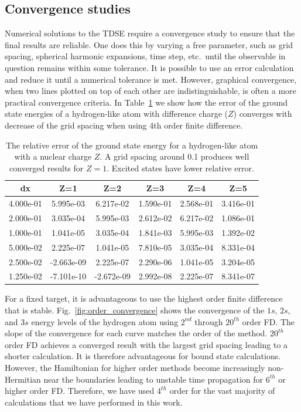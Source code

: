 \subsection{Convergence studies} %
\label{sub:convergence_studies}
Numerical solutions to the TDSE require a convergence study to ensure that the final results are reliable. One does this by varying  a free parameter, such as grid spacing, spherical harmonic expansions, time step, etc.\ until the observable in question remains within some tolerance. It is possible to use an error calculation and reduce it until a numerical tolerance is met. However, graphical convergence, when two lines plotted on top of each other are indistinguishable, is often a more practical convergence criteria. In Table~\ref{tab:grid_spacing} we show how the error of the ground state energies of a hydrogen-like atom with difference charge ($Z$) converges with decrease of the grid spacing when using 4th order finite difference.
\begin{table}[t]
\begin{center}
\begin{tabular}{|c|c|c|c|c|c|}
\hline
dx & Z=1 & Z=2 & Z=3 & Z=4 & Z=5 \\ \hline
4.000e-01 & 5.995e-03 & 6.217e-02 & 1.590e-01 & 2.568e-01 & 3.416e-01\\ \hline
2.000e-01 & 3.035e-04 & 5.995e-03 & 2.612e-02 & 6.217e-02 & 1.086e-01\\ \hline
1.000e-01 & 1.041e-05 & 3.035e-04 & 1.841e-03 & 5.995e-03 & 1.392e-02\\ \hline
5.000e-02 & 2.225e-07 & 1.041e-05 & 7.810e-05 & 3.035e-04 & 8.331e-04\\ \hline
2.500e-02 & -2.663e-09 & 2.225e-07 & 2.290e-06 & 1.041e-05 & 3.204e-05\\ \hline
1.250e-02 & -7.101e-10 & -2.672e-09 & 2.992e-08 & 2.225e-07 & 8.341e-07\\ \hline
\end{tabular}
\end{center}
  \caption{\label{tab:grid_spacing}The relative error of the ground state energy for a hydrogen-like atom with a nuclear charge $Z$. A grid spacing around 0.1 produces well converged results for $Z=1$. Excited states have lower relative error.}
\end{table}

For a fixed target, it is advantageous to use the highest order finite difference that is stable. Fig.~\ref{fig:order_convergence} shows the convergence of the $1s$, $2s$, and $3s$ energy levels of the hydrogen atom using $2^{nd}$ through $20^{th}$ order FD. The slope of the convergence for each curve matches the order of the method. $20^{th}$ order FD achieves a converged result with the largest grid spacing leading to a shorter calculation. It is therefore advantageous for bound state calculations. However, the Hamiltonian for higher order methods become increasingly non-Hermitian near the boundaries leading to unstable time propagation for $6^{th}$ or higher order FD. Therefore, we have used $4^{th}$ order for the vast majority of calculations that we have performed in this work.

